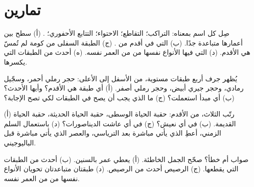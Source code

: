 \section{تمارين}

\begin{exercise}[$\star$]\label{exo:g7:geological-time:1}
صِل كل اسم بمعناه: التراكب؛ التقاطع؛ الاحتواء؛ التتابع الأحفوري؛ . (أ) سطح  بين  أعمارها متباعدة جدًا. (ب)  التي
في  أقدم من . (ج) الطبقة السفلى من كومة لم تُمسّ هي الأقدم. (د)
 التي فيها الأنواع نفسها من  من العمر نفسه. (ه)  أحدث
من الطبقات التي يكسرها.
\end{exercise}

\begin{exercise}[$\star$]\label{exo:g7:geological-time:2}
يُظهر جرف أربع طبقات مستوية، من الأسفل إلى الأعلى: حجر رملي أحمر، وسجّيل
رمادي، وحجر جيري أبيض، وحجر رملي أصفر. (أ) أي طبقة هي الأقدم؟ وأيها
الأحدث؟ (ب) أي مبدأ استعملت؟ (ج) ما الذي يجب أن يصح في الطبقات لكي
تصح الإجابة؟
\end{exercise}

\begin{exercise}[$\star$]\label{exo:g7:geological-time:3}
(أ) رتّب  الثلاث، من الأقدم: حقبة الحياة الوسطى، حقبة الحياة
الحديثة، حقبة الحياة القديمة. (ب) في أي  نعيش؟ (ج) في أي  عاشت
الديناصورات؟ (د) باستعمال السلم الزمني، أعطِ  الذي يأتي
مباشرة بعد الترياسي، والعصر الذي يأتي مباشرة قبل الباليوجيني.
\end{exercise}

\begin{exercise}[$\star$]\label{exo:g7:geological-time:4}
صواب أم خطأ؟ صحّح الجمل الخاطئة. (أ)  يعطي عمر 
بالسنين. (ب)  أحدث من الطبقات التي يقطعها. (ج)  الرصيص أحدث من
الرصيص. (د) طبقتان متباعدتان تحويان الأنواع نفسها من  من العمر
نفسه.
\end{exercise}

